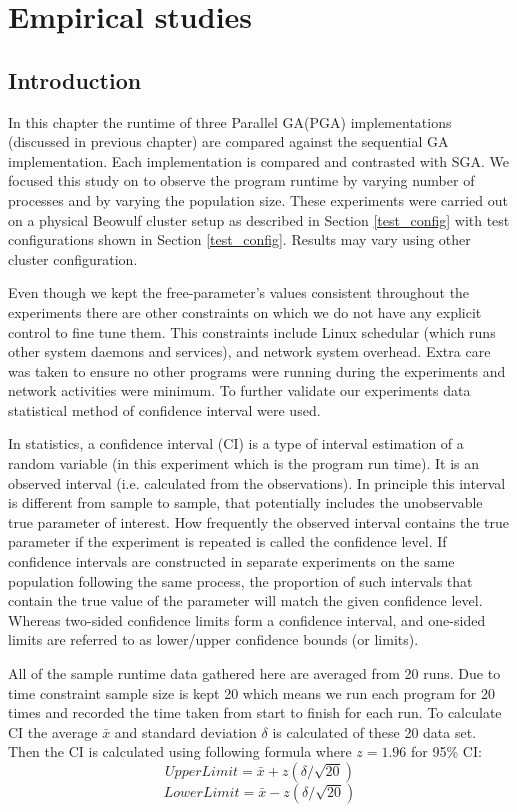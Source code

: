 \chapter{Empirical studies}
\label{empirical}

\section{Introduction}
In this chapter the runtime of three Parallel GA(PGA) implementations (discussed in previous chapter) are compared against the sequential GA implementation. Each implementation is compared and contrasted with SGA. We focused this study on to observe the program runtime by varying number of processes and by varying the population size. These experiments were carried out on a physical Beowulf cluster setup as described in Section \ref{test_config} with test configurations shown in Section \ref{test_config}. Results may vary using other cluster configuration.


Even though we kept the free-parameter's values consistent throughout the experiments there are other constraints on which we do not have any explicit control to fine tune them. This constraints include Linux schedular (which runs other system daemons and services), and network system overhead. Extra care was taken to ensure no other programs were running during the experiments and network activities were minimum. To further validate our experiments data  statistical method of confidence interval were used. 

In statistics, a confidence interval (CI) is a type of interval estimation of a random variable (in this experiment which is the program run time). It is an observed interval (i.e. calculated from the observations). In principle this interval is different from sample to sample, that potentially includes the unobservable true parameter of interest. How frequently the observed interval contains the true parameter if the experiment is repeated is called the confidence level. If confidence intervals are constructed in separate experiments on the same population following the same process, the proportion of such intervals that contain the true value of the parameter will match the given confidence level\citep{cox1979theoretical}. Whereas two-sided confidence limits form a confidence interval, and one-sided limits are referred to as lower/upper confidence bounds (or limits).

All of the sample runtime data gathered here are averaged from 20 runs. Due to time constraint sample size is kept 20 which means we run each program for 20 times and recorded the time taken from start to finish for each run. To calculate CI the average \textbf{$ \bar{x} $ } and standard deviation \textbf{$ \delta $} is calculated of these 20 data set. Then the CI is calculated using following formula where \textbf{$z = 1.96 $} for 95\% CI:
\[
	Upper Limit = \bar{x} + z (\delta/\sqrt{20})
\]
\[
	Lower Limit = \bar{x} - z (\delta/\sqrt{20})
\]

